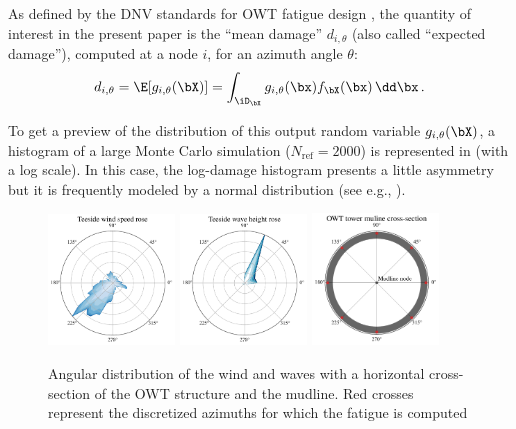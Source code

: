As defined by the DNV standards for OWT fatigue design \citep{dnv_fatigue_2016}, the quantity of interest in the present paper is the ``mean damage'' $d_{i, \theta}$ (also called ``expected damage''), computed at a node $i$, for an azimuth angle $\theta$:
\begin{equation}
    d_{i, \theta} = \E[g_{i, \theta}(\bX)] = \int_{\iD_\bX} g_{i, \theta}(\bx) f_{\bX}(\bx)\, \dd \bx \,.
    \label{eq:mean_integral}
\end{equation}

To get a preview of the distribution of this output random variable $g_{i, \theta}(\bX)$, a histogram of a large Monte Carlo simulation ($N_{\mathrm{ref}}=2000$) is represented in  (with a log scale). 
In this case, the log-damage histogram presents a little asymmetry but it is frequently modeled by a normal distribution (see e.g., \citet{teixeira_2019}). 

\begin{figure}[!h]
\begin{center}
    \includegraphics[width=0.3\textwidth]{part2/figures/DCE/teesside/teeside_wind_rose.pdf} \quad
    \includegraphics[width=0.3\textwidth]{part2/figures/DCE/teesside/teeside_wave_rose.pdf} \quad
    \includegraphics[width=0.3\textwidth]{part2/figures/DCE/teesside/mudline_crossection.pdf}
\end{center}
\caption{Angular distribution of the wind and waves with a horizontal cross-section of the OWT structure and the mudline. 
Red crosses represent the discretized azimuths for which the fatigue is computed}
\label{fig:wind_wave_roses}
\end{figure}

